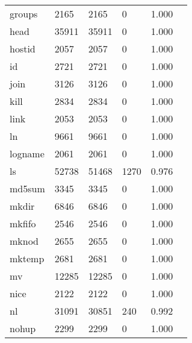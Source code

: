 \begin{longtable}{lp{2.40cm}p{2.40cm}p{2.40cm}p{2.40cm}p{2.40cm}}
groups    &                     2165 &         2165 &             0 &                    1.000 \\
head      &                    35911 &        35911 &             0 &                    1.000 \\
hostid    &                     2057 &         2057 &             0 &                    1.000 \\
id        &                     2721 &         2721 &             0 &                    1.000 \\
join      &                     3126 &         3126 &             0 &                    1.000 \\
kill      &                     2834 &         2834 &             0 &                    1.000 \\
link      &                     2053 &         2053 &             0 &                    1.000 \\
ln        &                     9661 &         9661 &             0 &                    1.000 \\
logname   &                     2061 &         2061 &             0 &                    1.000 \\
ls        &                    52738 &        51468 &          1270 &                    0.976 \\
md5sum    &                     3345 &         3345 &             0 &                    1.000 \\
mkdir     &                     6846 &         6846 &             0 &                    1.000 \\
mkfifo    &                     2546 &         2546 &             0 &                    1.000 \\
mknod     &                     2655 &         2655 &             0 &                    1.000 \\
mktemp    &                     2681 &         2681 &             0 &                    1.000 \\
mv        &                    12285 &        12285 &             0 &                    1.000 \\
nice      &                     2122 &         2122 &             0 &                    1.000 \\
nl        &                    31091 &        30851 &           240 &                    0.992 \\
nohup     &                     2299 &         2299 &             0 &                    1.000 \\

\end{longtable}
